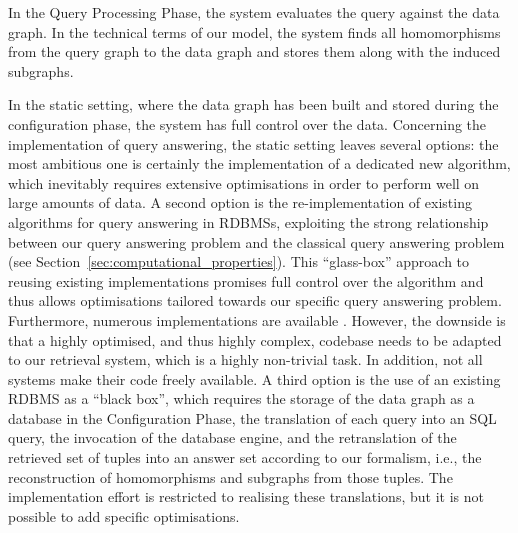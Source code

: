 In the Query Processing Phase, the system evaluates the query against the
data graph.
In the technical terms of our model, the system finds all homomorphisms from the query graph
to the data graph and stores them along with the induced subgraphs.

In the static setting, where the data graph has been built and stored during the
configuration phase, the system has full control over the data.
Concerning the implementation of query answering,
the static setting leaves several options:
the most ambitious one is certainly the implementation of a dedicated new
algorithm, which inevitably requires extensive optimisations in order to perform
well on large amounts of data.
A second option is the re-implementation of existing algorithms
for query answering in \glspl{RDBMS}, exploiting the strong relationship
between our query answering problem and the classical query answering problem
(see Section~\ref{sec:computational_properties}).
This \enquote{glass-box} approach to reusing existing implementations promises
full control over the algorithm and thus allows optimisations tailored
towards our specific query answering problem.
Furthermore, numerous implementations are available \autocite[cf.][]{WikiSQLRDBMSs}.
However, the downside is that a highly optimised, and thus highly complex,
codebase needs to be adapted to our retrieval system, which is a
highly non-trivial task. In addition, not all systems make their code freely available.
A third option is the use of an existing \gls{RDBMS} as a \enquote{black box},
which requires the storage of the data graph as a database in the Configuration Phase,
the translation of each query into an SQL query,
the invocation of the database engine,
and the retranslation of the retrieved set of tuples
into an answer set according to our formalism, i.e.,
the reconstruction of homomorphisms and subgraphs from those tuples.
The implementation effort is restricted to realising these translations,
but it is not possible to add specific optimisations.

